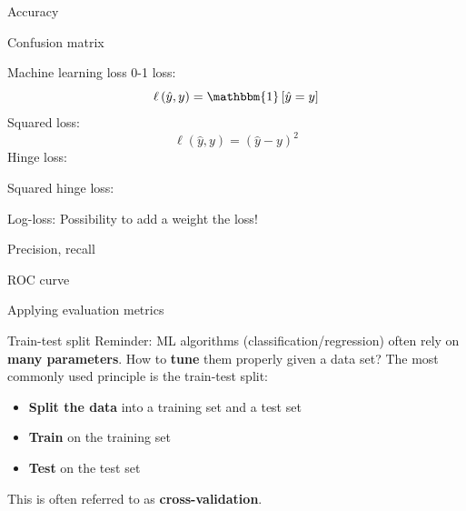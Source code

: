 \documentclass{beamer}
\newcommand{\1}[1]{\mathbbm{1}\left[#1\right]}
\begin{document}
\begin{frame}{Accuracy}

\end{frame}

\begin{frame}{Confusion matrix}

\end{frame}

\begin{frame}{Machine learning loss}
0-1 loss:
$$ \ell \left( \hat{y}, y \right) = \1{\hat{y} = y}$$
\vfill
\pause
Squared loss:
$$ \ell \left( \hat{y}, y \right) = \left( \hat{y} - y\right)^2$$
\vfill
\pause
Hinge loss:

\vfill
\pause
Squared hinge loss:

\vfill
\pause
Log-loss:
\vfill
\pause
Possibility to add a weight the loss!

\end{frame}

\begin{frame}{Precision, recall}

\end{frame}

\begin{frame}{ROC curve}

\end{frame}

\begin{frame}
\begin{center}
\Huge{Applying evaluation metrics}
\end{center}
\end{frame}

\begin{frame}{Train-test split}
Reminder: ML algorithms (classification/regression) often rely on \textbf{many parameters}. How to \textbf{tune} them properly given a data set?
\vfill
\pause
The most commonly used principle is the train-test split:
\begin{itemize}
	\item \textbf{Split the data} into a training set and a test set
	\item \textbf{Train} on the training set
	\item \textbf{Test} on the test set
\end{itemize}
\vfill
\pause
This is often referred to as \textbf{cross-validation}.
\end{frame}
\end{document}
